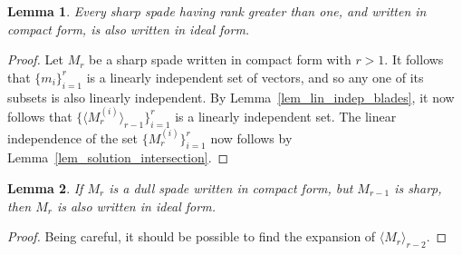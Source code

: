 \documentclass{birkjour}
\newtheorem{thm}{Theorem}[section]
\newtheorem{lem}[thm]{Lemma}
\theoremstyle{definition}
\theoremstyle{remark}
\numberwithin{equation}{section}
\begin{document}
\begin{lem}\label{lem_lin_indep_sharp_blades}
Every sharp spade having rank greater than one, and written in compact form, is also written in ideal form.
\end{lem}
\begin{proof}
Let $M_r$ be a sharp spade written in compact form with $r>1$.  It follows that
$\{m_i\}_{i=1}^r$ is a linearly independent set of vectors, and so any
one of its subsets is also linearly independent.  By Lemma~\ref{lem_lin_indep_blades},
it now follows that $\{\langle M_r^{(i)}\rangle_{r-1}\}_{i=1}^r$ is a linearly independent set.
The linear independence of the set $\{M_r^{(i)}\}_{i=1}^r$ now follows by Lemma~\ref{lem_solution_intersection}.
\end{proof}


\begin{lem}
If $M_r$ is a dull spade written in compact form, but $M_{r-1}$ is sharp, then
$M_r$ is also written in ideal form.
\end{lem}
\begin{proof}
Being careful, it should be possible to find the expansion of $\langle M_r\rangle_{r-2}$.
\end{proof}

\end{document}
